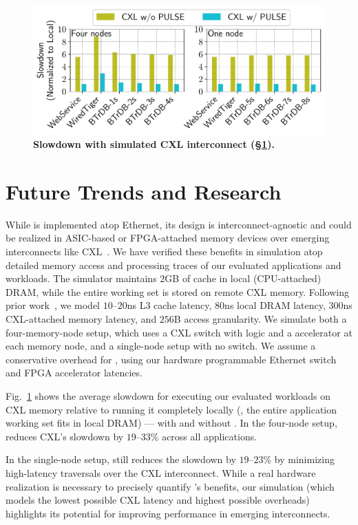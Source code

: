 \begin{figure}[t]
\centering
\includegraphics[width=0.9\columnwidth]{fig/pulse/cxl.pdf}
\vspace{-1em}
\caption{
\textbf{Slowdown with simulated CXL interconnect (\S\ref{sec:future}).} 
}

\label{fig:eval_cxl}
\end{figure}

\section{Future Trends and Research}
\label{sec:future}


While \pulse is implemented atop Ethernet, its design is interconnect-agnostic and could be realized in ASIC-based or FPGA-attached memory devices over emerging interconnects like CXL~\cite{cxl, cxl_azure, sun2023demystifying}. We have verified these benefits in simulation atop detailed memory access and processing traces of our evaluated applications and workloads. The simulator maintains $2$GB of cache in local (CPU-attached) DRAM, while the entire working set is stored on remote CXL memory. Following prior work~\cite{pond}, we model $10$--$20$ns L3 cache latency, $80$ns local DRAM latency, $300$ns CXL-attached memory latency, and $256$B access granularity. We simulate both a four-memory-node setup, which uses a CXL switch with \pulse logic and a \pulse accelerator at each memory node, and a single-node setup with no switch. We assume a conservative overhead for \pulse, using our hardware programmable Ethernet switch and FPGA accelerator latencies.
 
 
Fig.~\ref{fig:eval_cxl} shows the average slowdown for executing our evaluated workloads on CXL memory relative to running it completely locally (\ie, the entire application working set fits in local DRAM) --- with and without \pulse. In the four-node setup, \pulse reduces CXL's slowdown by $19$--$33$\% across all applications. 

In the single-node setup, \pulse still reduces the slowdown by $19$--$23$\% by minimizing high-latency traversals over the CXL interconnect. While a real hardware realization is necessary to precisely quantify \pulse's benefits, our simulation (which models the lowest possible CXL latency and highest possible \pulse overheads) highlights its potential for improving performance in emerging interconnects.
